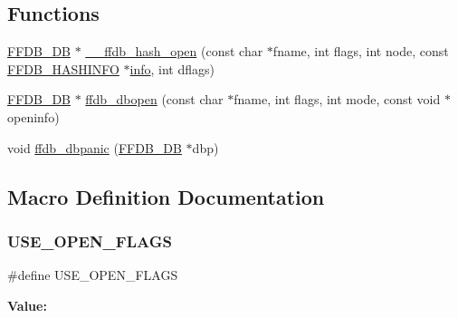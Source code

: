 \subsection*{Functions}
\begin{DoxyCompactItemize}
\item 
\mbox{\hyperlink{adat-devel_2other__libs_2filedb_2filehash_2ffdb__db_8h_a0b27b956926453a7a8141ea8e10f0df8}{F\+F\+D\+B\+\_\+\+DB}} $\ast$ \mbox{\hyperlink{adat-devel_2other__libs_2filedb_2filehash_2ffdb__db_8c_a415affcc4f0854dfe569ac4c43a72e7f}{\+\_\+\+\_\+ffdb\+\_\+hash\+\_\+open}} (const char $\ast$fname, int flags, int node, const \mbox{\hyperlink{structFFDB__HASHINFO}{F\+F\+D\+B\+\_\+\+H\+A\+S\+H\+I\+N\+FO}} $\ast$\mbox{\hyperlink{structinfo}{info}}, int dflags)
\item 
\mbox{\hyperlink{adat-devel_2other__libs_2filedb_2filehash_2ffdb__db_8h_a0b27b956926453a7a8141ea8e10f0df8}{F\+F\+D\+B\+\_\+\+DB}} $\ast$ \mbox{\hyperlink{adat-devel_2other__libs_2filedb_2filehash_2ffdb__db_8c_a956b24369a3231de1bee8bc33cae46e0}{ffdb\+\_\+dbopen}} (const char $\ast$fname, int flags, int mode, const void $\ast$openinfo)
\item 
void \mbox{\hyperlink{adat-devel_2other__libs_2filedb_2filehash_2ffdb__db_8c_a1ec8fa0dcde4004262934cdb85099527}{ffdb\+\_\+dbpanic}} (\mbox{\hyperlink{adat-devel_2other__libs_2filedb_2filehash_2ffdb__db_8h_a0b27b956926453a7a8141ea8e10f0df8}{F\+F\+D\+B\+\_\+\+DB}} $\ast$dbp)
\end{DoxyCompactItemize}


\subsection{Macro Definition Documentation}
\mbox{\label{adat-devel_2other__libs_2filedb_2filehash_2ffdb__db_8c_abd9515294d2a64b57210563fa8795b99}} 
\subsubsection{\texorpdfstring{USE\_OPEN\_FLAGS}{USE\_OPEN\_FLAGS}}
{\footnotesize\ttfamily \#define U\+S\+E\+\_\+\+O\+P\+E\+N\+\_\+\+F\+L\+A\+GS}

{\bfseries Value\+:}
\begin{DoxyCode}{0}

\end{DoxyCode}


